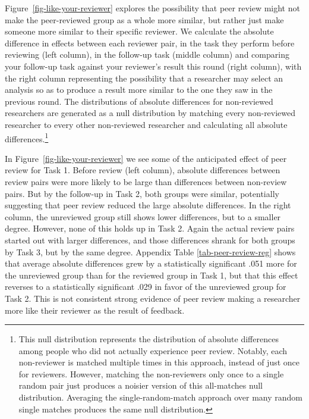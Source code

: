 \documentclass[
  letterpaper,
  DIV=11,
  numbers=noendperiod]{scrartcl}
\begin{document}
Figure~\ref{fig-like-your-reviewer} explores the possibility that peer
review might not make the peer-reviewed group as a whole more similar,
but rather just make someone more similar to their specific reviewer. We
calculate the absolute difference in effects between each reviewer pair,
in the task they perform before reviewing (left column), in the
follow-up task (middle column) and comparing your follow-up task against
your reviewer's result this round (right column), with the right column
representing the possibility that a researcher may select an analysis so
as to produce a result more similar to the one they saw in the previous
round. The distributions of absolute differences for non-reviewed
researchers are generated as a null distribution by matching every
non-reviewed researcher to every other non-reviewed researcher and
calculating all absolute differences.\footnote{This null distribution
  represents the distribution of absolute differences among people who
  did not actually experience peer review. Notably, each non-reviewer is
  matched multiple times in this approach, instead of just once for
  reviewers. However, matching the non-reviewers only once to a single
  random pair just produces a noisier version of this all-matches null
  distribution. Averaging the single-random-match approach over many
  random single matches produces the same null distribution.}

In Figure~\ref{fig-like-your-reviewer} we see some of the anticipated
effect of peer review for Task 1. Before review (left column), absolute
differences between review pairs were more likely to be large than
differences between non-review pairs. But by the follow-up in Task 2,
both groups were similar, potentially suggesting that peer review
reduced the large absolute differences. In the right column, the
unreviewed group still shows lower differences, but to a smaller degree.
However, none of this holds up in Task 2. Again the actual review pairs
started out with larger differences, and those differences shrank for
both groups by Task 3, but by the same degree. Appendix Table
\ref{tab-peer-review-reg} shows that average absolute differences grew
by a statistically significant .051 more for the unreviewed group than
for the reviewed group in Task 1, but that this effect reverses to a
statistically significant .029 in favor of the unreviewed group for Task
2. This is not consistent strong evidence of peer review making a
researcher more like their reviewer as the result of feedback.
\end{document}
